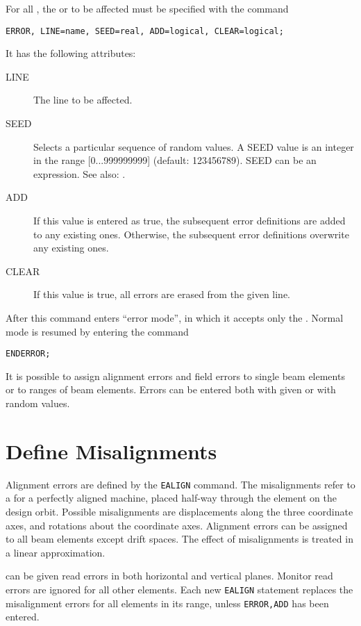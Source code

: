 For all ,
the  or  to be
affected must be specified with the command
\begin{verbatim}
ERROR, LINE=name, SEED=real, ADD=logical, CLEAR=logical;
\end{verbatim}
It has the following attributes:
\begin{description}
\item[LINE]
  The line to be affected.
\item[SEED]
  Selects a particular sequence of random values.
  A SEED value is an integer in the range [0...999999999] (default: 123456789).
  SEED can be an expression.
  See also: .
\item[ADD]
  If this value is entered as true, the subsequent error definitions
  are added to any existing ones.
  Otherwise, the subsequent error definitions overwrite any existing
  ones.
\item[CLEAR]
  If this value is true, all errors are erased from the given line.
\end{description}
After this command \opal enters ``error mode'', in which it accepts only
the .
Normal mode is resumed by entering the command
\begin{verbatim}
ENDERROR;
\end{verbatim}
It is possible to assign alignment errors and field errors
to single beam elements or to ranges of beam elements.
Errors can be entered both with given or with random values.

\section{Define Misalignments}
\label{sec:erroralign}
Alignment errors are defined by the \texttt{EALIGN} command.
The misalignments refer to a 
for a perfectly aligned machine, placed half-way through the element
on the design orbit.
Possible misalignments are displacements along the three coordinate axes,
and rotations about the coordinate axes.
Alignment errors can be assigned to all beam elements except drift spaces.
The effect of misalignments is treated in a linear approximation.

can be given read errors in both horizontal and vertical planes.
Monitor read errors are ignored for all other elements.
Each new \texttt{EALIGN} statement replaces the misalignment errors
for all elements in its range, unless \texttt{ERROR,ADD}
has been entered.

